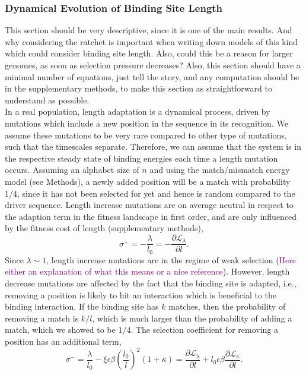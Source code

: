 \documentclass[10pt,a4paper]{article}
\newcommand{\purple}[1]{\textcolor{purple}{#1}}
\begin{document}
\subsubsection*{Dynamical Evolution of Binding Site Length}
{\color{ForestGreen} This section should be very descriptive, since it is one of the main results. And why considering the ratchet is important when writing down models of this kind which could consider binding site length. Also, could this be a reason for larger genomes, as soon as selection pressure decreases? Also, this section should have a minimal number of equations, just tell the story, and any computation should be in the supplementary methods, to make this section as straightforward to understand as possible. }\\

In a real population, length adaptation is a dynamical process, driven by mutations which include a new position in the sequence in its recognition. We assume these mutations to be very rare compared to other type of mutations, such that the timescales separate. Therefore, we can assume that the system is in the respective steady state of binding energies each time a length mutation occurs. Assuming an alphabet size of $n$ and using the match/mismatch energy model (see Methods), a newly added position will be a match with probability 1/4, since it has not been selected for yet and hence is random compared to the driver sequence. Length increase mutations are on average neutral in respect to the adaption term in the fitness landscape in first order, and are only influenced by the fitness cost of length (supplementary methods),
\begin{equation}
	\sigma^+ = -\frac{\lambda}{l_0} =-\frac{\partial \mathcal{L}_\lambda}{\partial l}.
\end{equation}
Since $\lambda\sim 1$, length increase mutations are in the regime of weak selection (\purple{Here either an explanation of what this means or a nice reference}).
However, length decrease mutations are affected by the fact that the binding site is adapted, i.e., removing a position is likely to hit an interaction which is beneficial to the binding interaction. If the binding site has $k$ matches, then the probability of removing a match is $k/l$, which is much larger than the probability of adding a match, which we showed to be $1/4$. The selection coefficient for removing a position has an additional term,
\begin{equation}
	\sigma^- = \frac{\lambda}{l_0} - \xi \epsilon\beta \left(\frac{l_0}{l}\right)^2 (1+\kappa) = \frac{\partial \mathcal{L}_\lambda}{\partial l} + l_0 \epsilon\beta\frac{\partial \mathcal{L_\kappa}}{\partial l}.
\end{equation}
\end{document}

